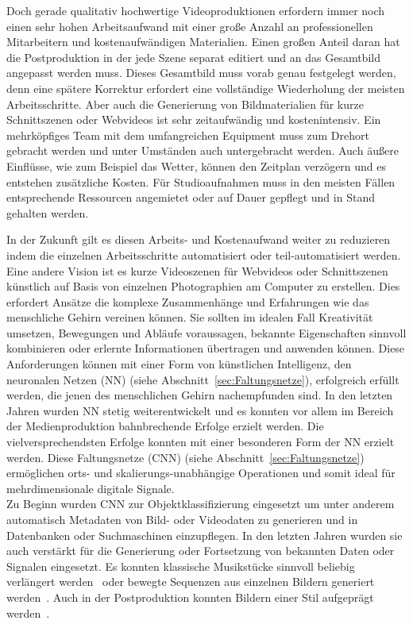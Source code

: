 \documentclass[times, 12pt,twocolumn]{article}
\begin{document}
Doch gerade qualitativ hochwertige Videoproduktionen erfordern immer noch einen sehr hohen Arbeitsaufwand mit einer große Anzahl an professionellen Mitarbeitern und kostenaufwändigen Materialien. Einen großen Anteil daran hat die Postproduktion in der jede Szene separat editiert und an das Gesamtbild angepasst werden muss. Dieses Gesamtbild muss vorab genau festgelegt werden, denn eine spätere Korrektur erfordert eine vollständige Wiederholung der meisten Arbeitsschritte. Aber auch die Generierung von Bildmaterialien für kurze Schnittszenen oder Webvideos ist sehr zeitaufwändig und kostenintensiv. Ein mehrköpfiges Team mit dem umfangreichen Equipment muss zum Drehort gebracht werden und unter Umständen auch untergebracht werden. Auch äußere Einflüsse, wie zum Beispiel das Wetter, können den Zeitplan verzögern und es entstehen zusätzliche Kosten. Für Studioaufnahmen muss in den meisten Fällen entsprechende Ressourcen angemietet oder auf Dauer gepflegt und in Stand gehalten werden.

In der Zukunft gilt es diesen Arbeits- und Kostenaufwand weiter zu reduzieren indem die einzelnen Arbeitsschritte automatisiert oder teil-automatisiert werden. Eine andere Vision ist es kurze Videoszenen für Webvideos oder Schnittszenen künstlich auf Basis von einzelnen Photographien am Computer zu erstellen. Dies erfordert Ansätze die komplexe Zusammenhänge und Erfahrungen wie das menschliche Gehirn vereinen können. Sie sollten im idealen Fall Kreativität umsetzen, Bewegungen und Abläufe voraussagen, bekannte Eigenschaften sinnvoll kombinieren oder erlernte Informationen übertragen und anwenden können. Diese Anforderungen können mit einer Form von künstlichen Intelligenz, den neuronalen Netzen (NN) (siehe Abschnitt~\ref{sec:Faltungsnetze}), erfolgreich erfüllt werden, die jenen des menschlichen Gehirn nachempfunden sind. In den letzten Jahren wurden NN stetig weiterentwickelt und es konnten vor allem im Bereich der Medienproduktion bahnbrechende Erfolge erzielt werden. Die vielversprechendsten Erfolge konnten mit einer besonderen Form der NN erzielt werden. Diese Faltungsnetze (CNN) (siehe Abschnitt~\ref{sec:Faltungsnetze}) ermöglichen orts- und skalierungs-unabhängige Operationen und somit ideal für mehrdimensionale digitale Signale.\\

Zu Beginn wurden CNN zur Objektklassifizierung eingesetzt um unter anderem automatisch Metadaten von Bild- oder Videodaten zu generieren und in Datenbanken oder Suchmaschinen einzupflegen. In den letzten Jahren wurden sie auch verstärkt für die Generierung oder Fortsetzung von bekannten Daten oder Signalen eingesetzt. Es konnten klassische Musikstücke sinnvoll beliebig verlängert werden~\cite{OordDZSVGKSK16} oder bewegte Sequenzen aus einzelnen Bildern generiert werden~\cite{VondrickPT16}. Auch in der Postproduktion konnten Bildern einer Stil aufgeprägt werden~\cite{DeepDream}. \\
\end{document}
